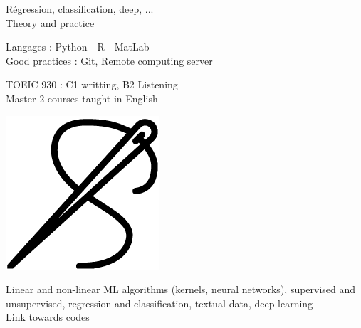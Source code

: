 

Régression, classification, deep, ... \\
Theory and practice\\
\vspace{0.3cm}

Langages :  Python - R - MatLab \\
Good practices : Git, Remote computing server
\vspace{0.3cm}

TOEIC 930 :  C1 writting, B2 Listening\\
Master 2 courses taught in English



\begin{center}
    \faItunesNote  \hspace{0.5cm}
    \faPlane \hspace{0.5cm} \faPalette \hspace{0.5cm} \includegraphics[width=0.05\linewidth]{CV/CV_english2/needle.png}  \hspace{0.5cm}  
    \faWrench 
\end{center}



Linear and non-linear ML algorithms (kernels, neural networks), supervised and unsupervised, regression and classification, textual data, deep learning\\
{\color{heading} \href{ https://github.com/ClaireGayral/formation_openclassroom}{ \faGithub \hspace{0.1cm} Link towards codes} 
}

